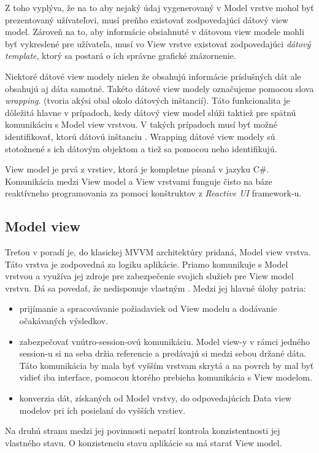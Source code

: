 \begin{itemize}
    Z toho vyplýva, že na to aby nejaký údaj vygenerovaný v Model vrstve mohol byť prezentovaný užívateľovi, musí preňho existovať zodpovedajúci dátový view model. Zároveň na to, aby informácie obsiahnuté v dátovom view modele mohli byť vykreslené pre užívateľa, musí vo View vrstve existovať zodpovedajúci \textit{dátový template}, ktorý sa postará o ích správne grafické znázornenie.

    Niektoré dátové view modely nielen že obsahujú informácie príslušných dát ale obsahujú aj dáta samotné. Takéto dátové view modely označujeme pomocou slova \textit{wrapping}. (tvoria akýsi obal okolo dátových inštancií). Táto funkcionalita je dôležitá hlavne v prípadoch, kedy dátový view model slúži taktiež pre spätnú komunikáciu s Model view vrstvou. V takých prípadoch musí byť možné identifikovať, ktorú dátovú inštanciu . Wrapping dátové view modely sú stotožnené s ich dátovým objektom a tiež sa pomocou neho identifikujú.  
\end{itemize}


View model je prvá z vrstiev, ktorá je kompletne písaná v jazyku C\#. Komunikácia medzi View model a View vrstvami funguje čisto na báze reaktívneho programovania za pomoci konštruktov z \textit{Reactive UI} framework-u.  

\subsection{Model view}

Treťou v poradí je, do klasickej MVVM architektúry pridaná, Model view vrstva. Táto vrstva je zodpovedná za  logiku aplikácie. Priamo komunikuje s Model vrstvou a využíva jej zdroje pre zabezpečenie svojich služieb pre View model vrstvu. Dá sa povedať, že nedisponuje vlastným . Medzi jej hlavné úlohy patria:  
\begin{itemize}
    \item prijímanie a spracovávanie požiadaviek od View modelu a dodávanie očakávaných výsledkov.  
    \item zabezpečovať vnútro-session-ovú komunikáciu. Model view-y v rámci jedného session-u si na seba držia referencie a predávajú si medzi sebou držané dáta. Táto komunikácia by mala byť vyšším vrstvam skrytá a na povrch by mal byť vidieť iba interface, pomocou ktorého prebieha komunikácia s View modelom.
    \item konverzia dát, získaných od Model vrstvy, do odpovedajúcich Data view modelov pri ích posielaní do vyšších vrstiev.  
\end{itemize}
Na druhú stranu medzi jej povinnosti nepatrí kontrola konzistentnosti jej vlastného stavu. O konzistenciu stavu aplikácie sa má starať View model.


